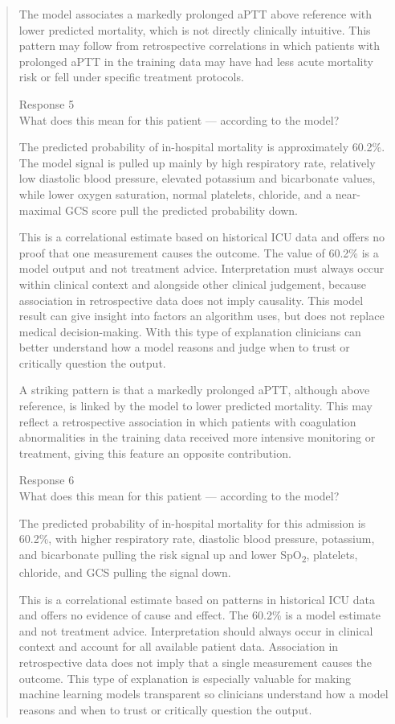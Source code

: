 \documentclass[12pt, a4paper]{article}
\begin{document}
\begin{quote}
The model associates a markedly prolonged aPTT above reference with lower predicted mortality, which is not directly clinically intuitive. This pattern may follow from retrospective correlations in which patients with prolonged aPTT in the training data may have had less acute mortality risk or fell under specific treatment protocols.

Response 5\\
What does this mean for this patient --- according to the model?

The predicted probability of in-hospital mortality is approximately 60.2\%. The model signal is pulled up mainly by high respiratory rate, relatively low diastolic blood pressure, elevated potassium and bicarbonate values, while lower oxygen saturation, normal platelets, chloride, and a near-maximal GCS score pull the predicted probability down.

This is a correlational estimate based on historical ICU data and offers no proof that one measurement causes the outcome. The value of 60.2\% is a model output and not treatment advice. Interpretation must always occur within clinical context and alongside other clinical judgement, because association in retrospective data does not imply causality. This model result can give insight into factors an algorithm uses, but does not replace medical decision-making. With this type of explanation clinicians can better understand how a model reasons and judge when to trust or critically question the output.

A striking pattern is that a markedly prolonged aPTT, although above reference, is linked by the model to lower predicted mortality. This may reflect a retrospective association in which patients with coagulation abnormalities in the training data received more intensive monitoring or treatment, giving this feature an opposite contribution.

Response 6\\
What does this mean for this patient --- according to the model?

The predicted probability of in-hospital mortality for this admission is 60.2\%, with higher respiratory rate, diastolic blood pressure, potassium, and bicarbonate pulling the risk signal up and lower SpO\textsubscript{2}, platelets, chloride, and GCS pulling the signal down.

This is a correlational estimate based on patterns in historical ICU data and offers no evidence of cause and effect. The 60.2\% is a model estimate and not treatment advice. Interpretation should always occur in clinical context and account for all available patient data. Association in retrospective data does not imply that a single measurement causes the outcome. This type of explanation is especially valuable for making machine learning models transparent so clinicians understand how a model reasons and when to trust or critically question the output.


\end{quote}
\end{document}
